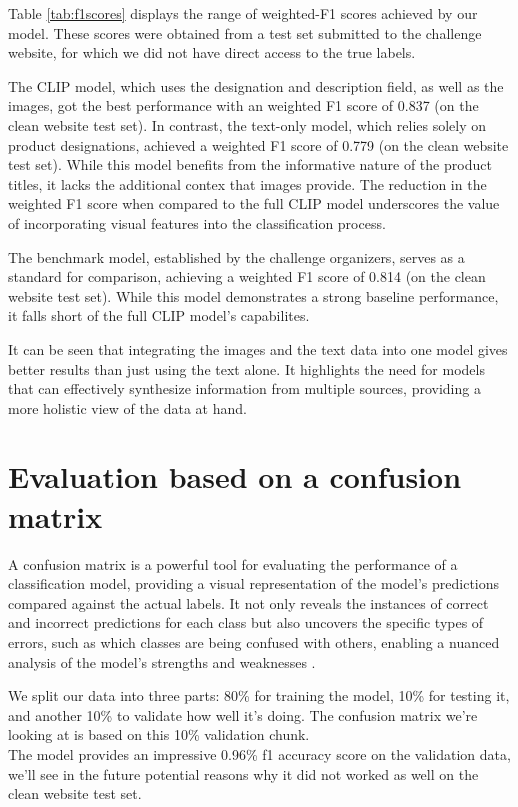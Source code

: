 Table \ref{tab:f1scores} displays the range of weighted-F1 scores achieved by our model. These scores were obtained from a test set submitted to the challenge website, for which we did not have direct access to the true labels.

The CLIP model, which uses the designation and description field, as well as the images, got the best performance with an weighted F1 score of 0.837 (on the clean website test set). In contrast, the text-only model, which relies solely on product designations, achieved a weighted F1 score of 0.779 (on the clean website test set). While this model benefits from the informative nature of the product titles, it lacks the additional contex that images provide. The reduction in the weighted F1 score when compared to the full CLIP model underscores the value of incorporating visual features into the classification process.

The benchmark model, established by the challenge organizers, serves as a standard for comparison, achieving a weighted F1 score of 0.814 (on the clean website test set). While this model demonstrates a strong baseline performance, it falls short of the full CLIP model's capabilites.

It can be seen that integrating the images and the text data into one model gives better results than just using the text alone. It highlights the need for models that can effectively synthesize information from multiple sources, providing a more holistic view of the data at hand.

\section{Evaluation based on a confusion matrix}

A confusion matrix is a powerful tool for evaluating the performance of a classification model, providing a visual representation of the model's predictions compared against the actual labels. It not only reveals the instances of correct and incorrect predictions for each class but also uncovers the specific types of errors, such as which classes are being confused with others, enabling a nuanced analysis of the model's strengths and weaknesses \cite{susmaga-2004}.

We split our data into three parts: 80\% for training the model, 10\% for testing it, and another 10\% to validate how well it's doing. The confusion matrix we're looking at is based on this 10\% validation chunk.\\
The model provides an impressive 0.96\% f1 accuracy score on the validation data, we'll see in the future potential reasons why it did not worked as well on the clean website test set.\\

